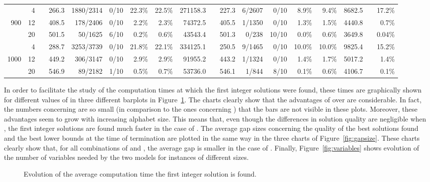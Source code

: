 \documentclass[11pt,a4paper]{article}
\newcommand{\ccg}{\cellcolor{lightgray}}
\begin{document}
\begin{sidewaystable}
{\begin{tabular}{rr r rrrrr r rrrrrrrrr}
     & 4  &&  266.3 & 1880/2314   &    0/10   & 22.3\% & 22.5\% & 271158.3   && \ccg227.3   & 6/2607     & 0/10  &  8.9\%  & 9.4\%  & 8682.5 && 17.2\% \\
900  & 12 &&  408.5 & 178/2406	  &    0/10   & 2.2\%  & 2.3\%  & 74372.5    &&	  \ccg405.5 & 1/1350	 & 0/10  &  1.3\%  & 1.5\%  & 4440.8 && 0.7\% \\
     & 20 &&  501.5 & 50/1625	  &    6/10   & 0.2\%  & 0.6\%  & 43543.4    &&	  \ccg501.3 & 0/238	 & 10/10 &  0.0\%  & 0.6\%  & 3649.8 && 0.04\% \\ \hline
     & 4  &&  288.7 & 3253/3739   &    0/10   & 21.8\% & 22.1\% & 334125.1   &&	  \ccg250.5 & 9/1465     & 0/10  &  10.0\% & 10.0\% & 9825.4 && 15.2\% \\
1000 & 12 &&  449.2 & 306/3147	  &    0/10   & 2.9\%  & 2.9\%  & 91955.2    &&	  \ccg443.2 & 1/1324	 & 0/10  &  1.4\%  & 1.7\%  & 5017.2 && 1.4\% \\
     & 20 &&  546.9 & 89/2182	  &    1/10   & 0.5\%  & 0.7\%  & 53736.0    &&	  \ccg546.1 & 1/844	 & 8/10  &  0.1\%  & 0.6\%  & 4106.7 && 0.1\% \\
\hline\hline
\end{tabular}}
\end{sidewaystable}

In order to facilitate the study of the computation times at which the first integer solutions were found, these times are graphically shown for different values of  in three different barplots in Figure~\ref{fig:firstsoltime}. The charts clearly show that the advantages of  over  are considerable. In fact, the numbers concerning  are so small (in comparison to the ones concerning ) that the bars are not visible in these plots. Moreover, these advantages seem to grow with increasing alphabet size. This means that, even though the differences in solution quality are negligible when , the first integer solutions are found much faster in the case of . The average gap sizes concerning the quality of the best solutions found and the best lower bounds at the time of termination are plotted in the same way in the three charts of Figure~\ref{fig:gapsize}. These charts clearly show that, for all combinations of  and , the average gap is smaller in the case of . Finally, Figure~\ref{fig:variables} shows evolution of the number of variables needed by the two models for instances of different sizes. 

\begin{figure}[!t]
\centering
{}
\caption{Evolution of the average computation time the first integer solution is found.}
\label{fig:firstsoltime}
\end{figure}
\end{document}
